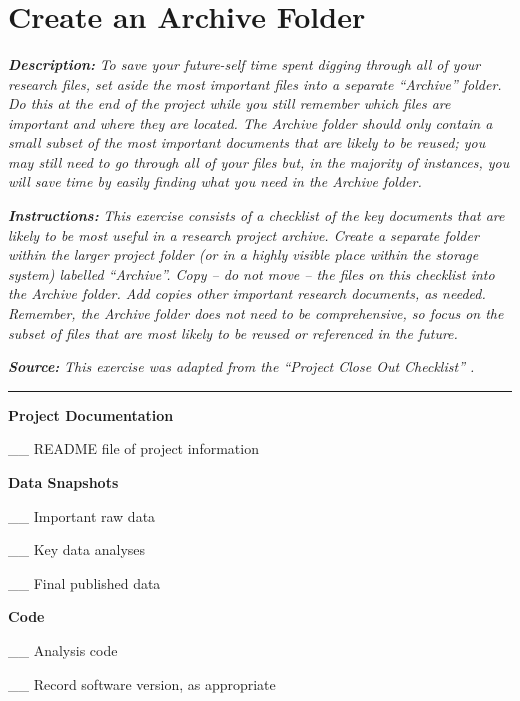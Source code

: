 \documentclass[
]{book}
\begin{document}
~

~

~

\hypertarget{archive-folder}{%
\section{Create an Archive Folder}\label{archive-folder}}

\textbf{\emph{Description:}} \emph{To save your future-self time spent digging through all of your research files, set aside the most important files into a separate ``Archive'' folder. Do this at the end of the project while you still remember which files are important and where they are located. The Archive folder should only contain a small subset of the most important documents that are likely to be reused; you may still need to go through all of your files but, in the majority of instances, you will save time by easily finding what you need in the Archive folder.}

\textbf{\emph{Instructions:}} \emph{This exercise consists of a checklist of the key documents that are likely to be most useful in a research project archive. Create a separate folder within the larger project folder (or in a highly visible place within the storage system) labelled ``Archive''. Copy -- do not move -- the files on this checklist into the Archive folder. Add copies other important research documents, as needed. Remember, the Archive folder does not need to be comprehensive, so focus on the subset of files that are most likely to be reused or referenced in the future.}

\textbf{\emph{Source:}} \emph{This exercise was adapted from the ``Project Close Out Checklist'' \citep{briney_project_2020}.}

\begin{center}\rule{0.5\linewidth}{0.5pt}\end{center}

\textbf{Project Documentation}

\_\_ README file of project information

\textbf{Data Snapshots}

\_\_ Important raw data

\_\_ Key data analyses

\_\_ Final published data

\textbf{Code}

\_\_ Analysis code

\_\_ Record software version, as appropriate
\end{document}
